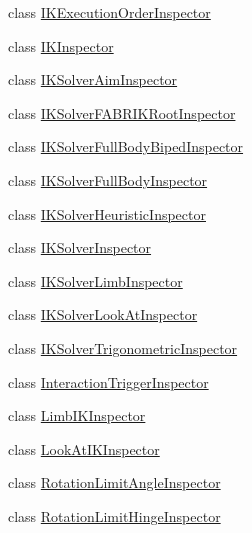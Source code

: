 \begin{DoxyCompactItemize}
\item 
class \mbox{\hyperlink{class_root_motion_1_1_final_i_k_1_1_i_k_execution_order_inspector}{I\+K\+Execution\+Order\+Inspector}}
\item 
class \mbox{\hyperlink{class_root_motion_1_1_final_i_k_1_1_i_k_inspector}{I\+K\+Inspector}}
\item 
class \mbox{\hyperlink{class_root_motion_1_1_final_i_k_1_1_i_k_solver_aim_inspector}{I\+K\+Solver\+Aim\+Inspector}}
\item 
class \mbox{\hyperlink{class_root_motion_1_1_final_i_k_1_1_i_k_solver_f_a_b_r_i_k_root_inspector}{I\+K\+Solver\+F\+A\+B\+R\+I\+K\+Root\+Inspector}}
\item 
class \mbox{\hyperlink{class_root_motion_1_1_final_i_k_1_1_i_k_solver_full_body_biped_inspector}{I\+K\+Solver\+Full\+Body\+Biped\+Inspector}}
\item 
class \mbox{\hyperlink{class_root_motion_1_1_final_i_k_1_1_i_k_solver_full_body_inspector}{I\+K\+Solver\+Full\+Body\+Inspector}}
\item 
class \mbox{\hyperlink{class_root_motion_1_1_final_i_k_1_1_i_k_solver_heuristic_inspector}{I\+K\+Solver\+Heuristic\+Inspector}}
\item 
class \mbox{\hyperlink{class_root_motion_1_1_final_i_k_1_1_i_k_solver_inspector}{I\+K\+Solver\+Inspector}}
\item 
class \mbox{\hyperlink{class_root_motion_1_1_final_i_k_1_1_i_k_solver_limb_inspector}{I\+K\+Solver\+Limb\+Inspector}}
\item 
class \mbox{\hyperlink{class_root_motion_1_1_final_i_k_1_1_i_k_solver_look_at_inspector}{I\+K\+Solver\+Look\+At\+Inspector}}
\item 
class \mbox{\hyperlink{class_root_motion_1_1_final_i_k_1_1_i_k_solver_trigonometric_inspector}{I\+K\+Solver\+Trigonometric\+Inspector}}
\item 
class \mbox{\hyperlink{class_root_motion_1_1_final_i_k_1_1_interaction_trigger_inspector}{Interaction\+Trigger\+Inspector}}
\item 
class \mbox{\hyperlink{class_root_motion_1_1_final_i_k_1_1_limb_i_k_inspector}{Limb\+I\+K\+Inspector}}
\item 
class \mbox{\hyperlink{class_root_motion_1_1_final_i_k_1_1_look_at_i_k_inspector}{Look\+At\+I\+K\+Inspector}}
\item 
class \mbox{\hyperlink{class_root_motion_1_1_final_i_k_1_1_rotation_limit_angle_inspector}{Rotation\+Limit\+Angle\+Inspector}}
\item 
class \mbox{\hyperlink{class_root_motion_1_1_final_i_k_1_1_rotation_limit_hinge_inspector}{Rotation\+Limit\+Hinge\+Inspector}}

\end{DoxyCompactItemize}
